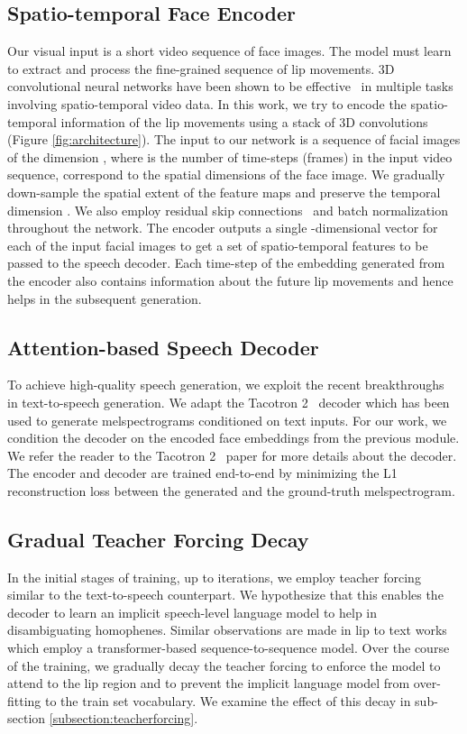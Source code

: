 \documentclass[10pt,twocolumn,letterpaper]{article}
\begin{document}
\subsection{Spatio-temporal Face Encoder}
Our visual input is a short video sequence of face images. The model must learn to extract and process the fine-grained sequence of lip movements. 3D convolutional neural networks have been shown to be effective~\cite{ji20123d,tran2015learning,vougioukas2019video} in multiple tasks involving spatio-temporal video data. In this work, we try to encode the spatio-temporal information of the lip movements using a stack of 3D convolutions (Figure \ref{fig:architecture}). The input to our network is a sequence of facial images of the dimension , where  is the number of time-steps (frames) in the input video sequence,  correspond to the spatial dimensions of the face image. We gradually down-sample the spatial extent of the feature maps and preserve the temporal dimension . We also employ residual skip connections~\cite{he2016deep} and batch normalization~\cite{ioffe2015batch} throughout the network. The encoder outputs a single -dimensional vector for each of the  input facial images to get a set of spatio-temporal features  to be passed to the speech decoder. Each time-step of the embedding generated from the encoder also contains information about the future lip movements and hence helps in the subsequent generation.

\subsection{Attention-based Speech Decoder}
To achieve high-quality speech generation, we exploit the recent breakthroughs~\cite{shen2018natural,ping2017deep} in text-to-speech generation. We adapt the Tacotron 2~\cite{shen2018natural} decoder which has been used to generate melspectrograms conditioned on text inputs. For our work, we condition the decoder on the encoded face embeddings from the previous module. We refer the reader to the Tacotron 2~\cite{shen2018natural} paper for more details about the decoder. The encoder and decoder are trained end-to-end by minimizing the L1 reconstruction loss between the generated and the ground-truth melspectrogram. 

\subsection{Gradual Teacher Forcing Decay}
In the initial stages of training, up to  iterations, we employ teacher forcing similar to the text-to-speech counterpart. We hypothesize that this enables the decoder to learn an implicit speech-level language model to help in disambiguating homophenes. Similar observations are made in lip to text works~\cite{Afouras2018DeepLR} which employ a transformer-based sequence-to-sequence model. Over the course of the training, we gradually decay the teacher forcing to enforce the model to attend to the lip region and to prevent the implicit language model from over-fitting to the train set vocabulary. We examine the effect of this decay in sub-section \ref{subsection:teacherforcing}.
\end{document}
